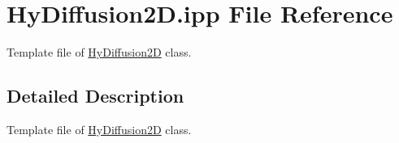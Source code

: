 \hypertarget{HyDiffusion2D_8ipp}{
\section{HyDiffusion2D.ipp File Reference}
\label{HyDiffusion2D_8ipp}
}


Template file of \hyperlink{classHyDiffusion2D}{HyDiffusion2D} class.  




\subsection{Detailed Description}
Template file of \hyperlink{classHyDiffusion2D}{HyDiffusion2D} class. 